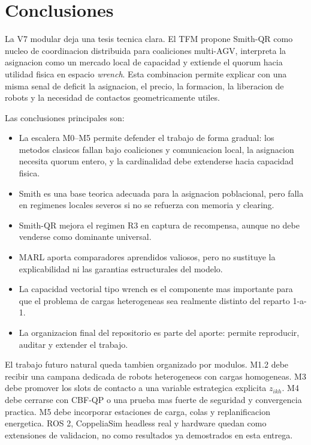 ﻿\section{Conclusiones}

La V7 modular deja una tesis tecnica clara. El TFM propone Smith-QR como nucleo de
coordinacion distribuida para coaliciones multi-AGV, interpreta la asignacion como un
mercado local de capacidad y extiende el quorum hacia utilidad fisica en espacio
\emph{wrench}. Esta combinacion permite explicar con una misma senal de deficit la
asignacion, el precio, la formacion, la liberacion de robots y la necesidad de contactos
geometricamente utiles.

Las conclusiones principales son:
\begin{itemize}[leftmargin=2em]
  \item La escalera M0--M5 permite defender el trabajo de forma gradual: los metodos
  clasicos fallan bajo coaliciones y comunicacion local, la asignacion necesita quorum
  entero, y la cardinalidad debe extenderse hacia capacidad fisica.
  \item Smith es una base teorica adecuada para la asignacion poblacional, pero falla en
  regimenes locales severos si no se refuerza con memoria y clearing.
  \item Smith-QR mejora el regimen R3 en captura de recompensa, aunque no debe venderse
  como dominante universal.
  \item MARL aporta comparadores aprendidos valiosos, pero no sustituye la explicabilidad
  ni las garantias estructurales del modelo.
  \item La capacidad vectorial tipo wrench es el componente mas importante para que el
  problema de cargas heterogeneas sea realmente distinto del reparto 1-a-1.
  \item La organizacion final del repositorio es parte del aporte: permite reproducir,
  auditar y extender el trabajo.
\end{itemize}

El trabajo futuro natural queda tambien organizado por modulos. M1.2 debe recibir una
campana dedicada de robots heterogeneos con cargas homogeneas. M3 debe promover los
slots de contacto a una variable estrategica explicita $z_{ikh}$. M4 debe cerrarse con
CBF-QP o una prueba mas fuerte de seguridad y convergencia practica. M5 debe incorporar
estaciones de carga, colas y replanificacion energetica. ROS 2, CoppeliaSim headless real
y hardware quedan como extensiones de validacion, no como resultados ya demostrados en
esta entrega.
